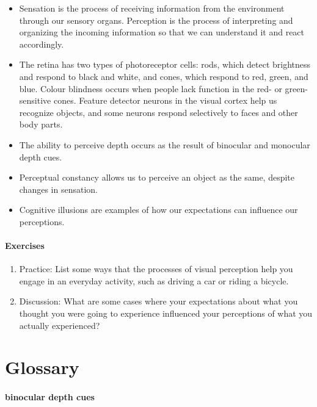 \documentclass[
]{krantz}
\providecommand{\tightlist}{%
  \setlength{\itemsep}{0pt}\setlength{\parskip}{0pt}}
\begin{document}
\begin{itemize}
\tightlist
\item
  Sensation is the process of receiving information from the environment through our sensory organs. Perception is the process of interpreting and organizing the incoming information so that we can understand it and react accordingly.
\item
  The retina has two types of photoreceptor cells: rods, which detect brightness and respond to black and white, and cones, which respond to red, green, and blue. Colour blindness occurs when people lack function in the red- or green-sensitive cones.
  Feature detector neurons in the visual cortex help us recognize objects, and some neurons respond selectively to faces and other body parts.
\item
  The ability to perceive depth occurs as the result of binocular and monocular depth cues.
\item
  Perceptual constancy allows us to perceive an object as the same, despite changes in sensation.
\item
  Cognitive illusions are examples of how our expectations can influence our perceptions.
\end{itemize}

\hypertarget{exercises-1}{%
\paragraph*{Exercises}\label{exercises-1}}

\begin{enumerate}
\def\labelenumi{\arabic{enumi}.}
\tightlist
\item
  Practice: List some ways that the processes of visual perception help you engage in an everyday activity, such as driving a car or riding a bicycle.
\item
  Discussion: What are some cases where your expectations about what you thought you were going to experience influenced your perceptions of what you actually experienced?
\end{enumerate}

\hypertarget{glossary-1}{%
\section{Glossary}\label{glossary-1}}

\hypertarget{binocular-depth-cues}{%
\paragraph*{binocular depth cues}\label{binocular-depth-cues}}
\end{document}
